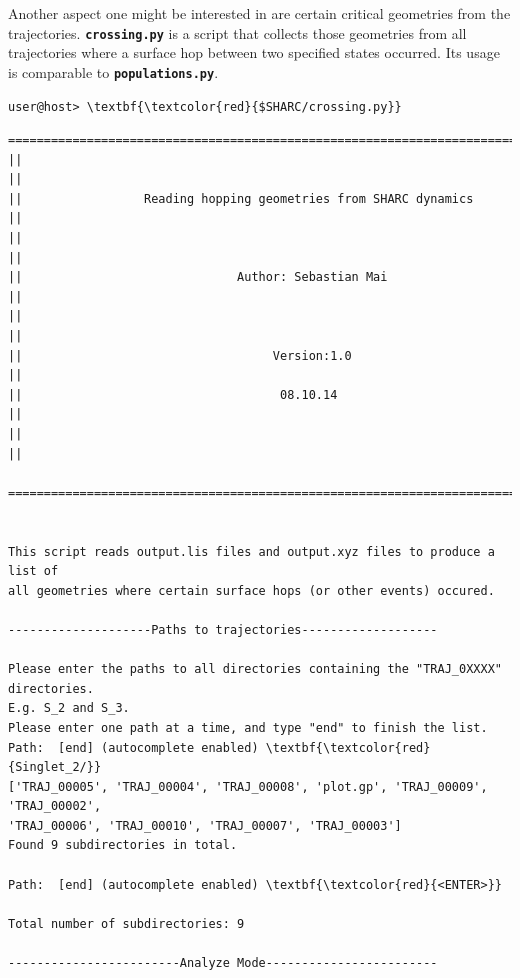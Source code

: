 \documentclass[a4paper,11pt,DIV=15,openany]{scrbook}
\newcommand{\ttt}[1]{\textbf{\texttt{#1}}}
\begin{document}
Another aspect one might be interested in are certain critical geometries from the trajectories.
\ttt{crossing.py} is a script that collects those geometries from all trajectories where a surface hop between two specified states occurred.
Its usage is comparable to \ttt{populations.py}.
\begin{Verbatim}[commandchars=\\\{\}]
user@host> \textbf{\textcolor{red}{$SHARC/crossing.py}}
\end{Verbatim}

\begin{oframed}
\footnotesize\begin{Verbatim}[commandchars=\\\{\}]
  ================================================================================
||                                                                                ||
||                 Reading hopping geometries from SHARC dynamics                 ||
||                                                                                ||
||                              Author: Sebastian Mai                             ||
||                                                                                ||
||                                   Version:1.0                                  ||
||                                    08.10.14                                    ||
||                                                                                ||
  ================================================================================


This script reads output.lis files and output.xyz files to produce a list of
all geometries where certain surface hops (or other events) occured.

--------------------Paths to trajectories-------------------

Please enter the paths to all directories containing the "TRAJ_0XXXX" directories.
E.g. S_2 and S_3.
Please enter one path at a time, and type "end" to finish the list.
Path:  [end] (autocomplete enabled) \textbf{\textcolor{red}{Singlet_2/}}
['TRAJ_00005', 'TRAJ_00004', 'TRAJ_00008', 'plot.gp', 'TRAJ_00009', 'TRAJ_00002', 
'TRAJ_00006', 'TRAJ_00010', 'TRAJ_00007', 'TRAJ_00003']
Found 9 subdirectories in total.

Path:  [end] (autocomplete enabled) \textbf{\textcolor{red}{<ENTER>}}

Total number of subdirectories: 9

------------------------Analyze Mode------------------------


\end{Verbatim}
\end{oframed}
\end{document}
